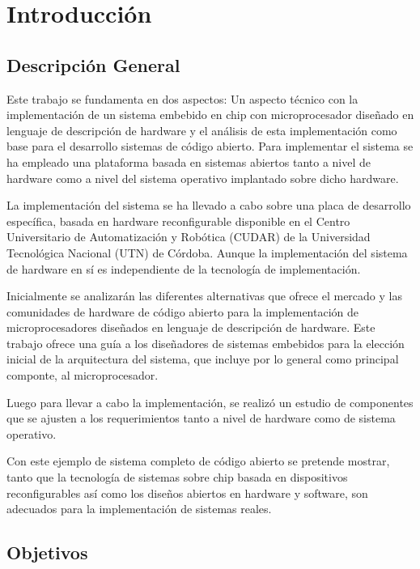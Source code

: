 \chapter{Introducción}

\section{Descripción General}
\par
Este trabajo se fundamenta en dos aspectos: Un aspecto técnico con la implementación de un sistema embebido en chip con microprocesador diseñado
en lenguaje de descripción de hardware y el análisis de esta implementación como base para el desarrollo sistemas de código abierto.
Para implementar el sistema se ha empleado una plataforma basada en sistemas abiertos tanto a nivel de hardware como a nivel del sistema operativo
implantado sobre dicho hardware.
\vspace{0.5cm}
\par
La implementación del sistema se ha llevado a cabo sobre una placa de desarrollo específica, basada en hardware reconfigurable disponible en el
Centro Universitario de Automatización y Robótica (CUDAR) de la Universidad Tecnológica Nacional (UTN) de Córdoba. Aunque la implementación del
sistema de hardware en sí es independiente de la tecnología de implementación.
\vspace{0.5cm}
\par
Inicialmente se analizarán las diferentes alternativas que ofrece el mercado y las comunidades de hardware de código abierto para la
implementación de microprocesadores diseñados en lenguaje de descripción de hardware. Este trabajo ofrece una guía a los diseñadores de
sistemas embebidos para la elección inicial de la arquitectura del sistema, que incluye por lo general como principal componte, al microprocesador.
\vspace{0.5cm}
\par
Luego para llevar a cabo la implementación, se realizó un estudio de componentes que se ajusten a los requerimientos tanto a nivel de hardware como
de sistema operativo.
\vspace{0.5cm}
\par
Con este ejemplo de sistema completo de código abierto se pretende mostrar, tanto que la tecnología de sistemas sobre chip basada en dispositivos
reconfigurables así como los diseños abiertos en hardware y software, son adecuados para la implementación de sistemas reales.

\section{Objetivos}
